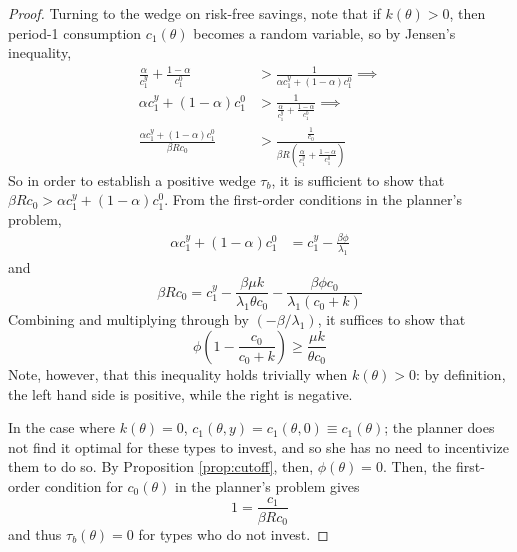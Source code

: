 \documentclass[11pt]{article}
\begin{document}
\begin{proof}
Turning to the
wedge on risk-free savings, note that if $k\left(\theta\right)>0$,
then period-1 consumption $c_{1}\left(\theta\right)$ becomes a random
variable, so by Jensen's inequality, 
\begin{align*}
\frac{\alpha}{c_{1}^{y}}+\frac{1-\alpha}{c_{1}^{0}} & >\frac{1}{\alpha c_{1}^{y}+\left(1-\alpha\right)c_{1}^{0}}\implies\\
\alpha c_{1}^{y}+\left(1-\alpha\right)c_{1}^{0} & >\frac{1}{\frac{\alpha}{c_{1}^{y}}+\frac{1-\alpha}{c_{1}^{0}}}\implies\\
\frac{\alpha c_{1}^{y}+\left(1-\alpha\right)c_{1}^{0}}{\beta Rc_{0}} & >\frac{\frac{1}{c_{0}}}{\beta R\left(\frac{\alpha}{c_{1}^{y}}+\frac{1-\alpha}{c_{1}^{0}}\right)}
\end{align*}
So in order to establish a positive wedge $\tau_{b}$, it is sufficient
to show that $\beta Rc_{0}>\alpha c_{1}^{y}+\left(1-\alpha\right)c_{1}^{0}$.
From the first-order conditions in the planner's problem, 
\begin{align*}
\alpha c_{1}^{y}+\left(1-\alpha\right)c_{1}^{0} & =c_{1}^{y}-\frac{\beta\phi}{\lambda_{1}}
\end{align*}
and
\[
\beta Rc_{0}=c_{1}^{y}-\frac{\beta\mu k}{\lambda_{1}\theta c_{0}}-\frac{\beta\phi c_{0}}{\lambda_{1}\left(c_{0}+k\right)}
\]
Combining and multiplying through by $\left(-\beta/\lambda_{1}\right)$,
it suffices to show that 
\[
\phi\left(1-\frac{c_{0}}{c_{0}+k}\right)\ge\frac{\mu k}{\theta c_{0}}
\]
Note, however, that this inequality holds trivially when \( k\left( \theta \right) >0 \): by definition,
the left hand side is positive, while the right is negative.

In the case where $k\left(\theta\right)=0$, $c_{1}\left(\theta,y\right)=c_{1}\left(\theta,0\right)\equiv c_{1}\left(\theta\right)$;
the planner does not find it optimal for these types to invest, and
so she has no need to incentivize them to do so. By Proposition \ref{prop:cutoff},
then, $\phi\left(\theta\right)=0$. Then, the first-order condition
for $c_{0}\left(\theta\right)$ in the planner's problem gives
\[
1=\frac{c_{1}}{\beta Rc_{0}}
\]
and thus $\tau_{b}\left(\theta\right)=0$ for types who do not invest. 
\end{proof}
\end{document}
